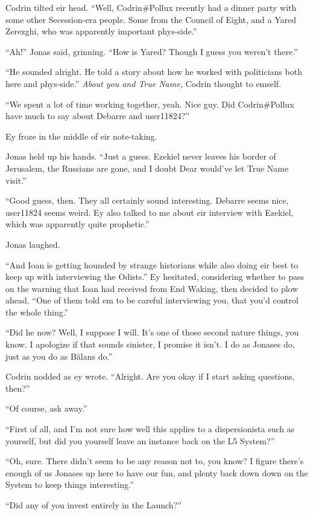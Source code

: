 Codrin tilted eir head. ``Well, Codrin\#Pollux recently had a dinner party with some other Secession-era people. Some from the Council of Eight, and a Yared Zerezghi, who was apparently important phys-side.''

``Ah!'' Jonas said, grinning. ``How is Yared? Though I guess you weren't there.''

``He sounded alright. He told a story about how he worked with politicians both here and phys-side.'' \emph{About you and True Name,} Codrin thought to emself.

``We spent a lot of time working together, yeah. Nice guy. Did Codrin\#Pollux have much to say about Debarre and user11824?''

Ey froze in the middle of eir note-taking.

Jonas held up his hands. ``Just a guess. Ezekiel never leaves his border of Jerusalem, the Russians are gone, and I doubt Dear would've let True Name visit.''

``Good guess, then. They all certainly sound interesting. Debarre seems nice, user11824 seems weird. Ey also talked to me about eir interview with Ezekiel, which was apparently quite prophetic.''

Jonas laughed.

``And Ioan is getting hounded by strange historians while also doing eir best to keep up with interviewing the Odists.'' Ey hesitated, considering whether to pass on the warning that Ioan had received from End Waking, then decided to plow ahead. ``One of them told em to be careful interviewing you, that you'd control the whole thing.''

``Did he now? Well, I suppose I will. It's one of those second nature things, you know. I apologize if that sounds sinister, I promise it isn't. I do as Jonases do, just as you do as Bălans do.''

Codrin nodded as ey wrote. ``Alright. Are you okay if I start asking questions, then?''

``Of course, ask away.''

``First of all, and I'm not sure how well this applies to a dispersionista such as yourself, but did you yourself leave an instance back on the L5 System?''

``Oh, sure. There didn't seem to be any reason not to, you know? I figure there's enough of us Jonases up here to have our fun, and plenty back down down on the System to keep things interesting.''

``Did any of you invest entirely in the Launch?''

